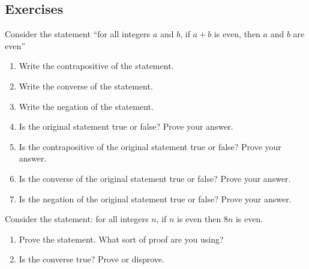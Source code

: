 \documentclass[10pt,]{book}
\theoremstyle{plain}
\theoremstyle{definition}
\theoremstyle{definition}
\theoremstyle{definition}
\theoremstyle{definition}
\numberwithin{equation}{chapter}
\begin{document}
\typeout{************************************************}
\typeout{************************************************}
\subsection*{Exercises}\label{exercises_logic-proofs}
\begin{divisionexercise}{1}\hypertarget{exercise-236}{}
\hypertarget{p-2108}{}%
Consider the statement ``for all integers \(a\) and \(b\), if \(a + b\) is even, then \(a\) and \(b\) are even''%
\par
\hypertarget{p-2109}{}%
\leavevmode%
\begin{enumerate}[label=(\alph*)]
\item\hypertarget{li-684}{}\hypertarget{p-2110}{}%
Write the contrapositive of the statement.%
\item\hypertarget{li-685}{}\hypertarget{p-2111}{}%
Write the converse of the statement.%
\item\hypertarget{li-686}{}\hypertarget{p-2112}{}%
Write the negation of the statement.%
\item\hypertarget{li-687}{}\hypertarget{p-2113}{}%
Is the original statement true or false? Prove your answer.%
\item\hypertarget{li-688}{}\hypertarget{p-2114}{}%
Is the contrapositive of the original statement true or false? Prove your answer.%
\item\hypertarget{li-689}{}\hypertarget{p-2115}{}%
Is the converse of the original statement true or false? Prove your answer.%
\item\hypertarget{li-690}{}\hypertarget{p-2116}{}%
Is the negation of the original statement true or false? Prove your answer.%
\end{enumerate}
%
\end{divisionexercise}%
\begin{divisionexercise}{2}\hypertarget{exercise-237}{}
\hypertarget{p-2125}{}%
Consider the statement: for all integers \(n\), if \(n\) is even then \(8n\) is even.%
\par
\hypertarget{p-2126}{}%
\leavevmode%
\begin{enumerate}[label=(\alph*)]
\item\hypertarget{li-698}{}\hypertarget{p-2127}{}%
Prove the statement. What sort of proof are you using?%
\item\hypertarget{li-699}{}\hypertarget{p-2128}{}%
Is the converse true? Prove or disprove.%
\end{enumerate}
%
\end{divisionexercise}%
\end{document}
